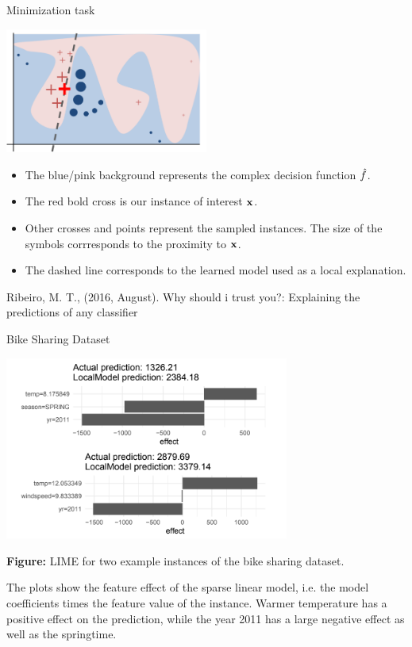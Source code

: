 \documentclass[11pt,compress,t,notes=noshow, xcolor=table]{beamer}
\begin{document}
\begin{vbframe}{Minimization task}
\begin{center}
 \includegraphics[width=0.5\textwidth]{figure/lime}
\end{center}
\begin{itemize}
  \item The blue/pink background represents the complex decision function $\fh$.
  \item The red bold cross is our instance of interest $\xv$.
  \item Other crosses and points represent the sampled instances. The size of the symbols corrresponds to the proximity to $\xv$.
  \item The dashed line corresponds to the learned model used as a local explanation.
\end{itemize}
{\tiny{Ribeiro, M. T., (2016, August). Why should i trust you?: Explaining the predictions of any classifier}}
\end{vbframe}

\begin{vbframe}{Bike Sharing Dataset}
\vspace{-.3cm}

\begin{center}
\includegraphics[width=0.7\textwidth]{figure/bike-figure.png}
\end{center} 

\footnotesize \textbf{Figure:} LIME for two example instances of the bike sharing dataset.

\normalsize
\vspace{0.2cm}
The plots show the feature effect of the sparse linear model, i.e. the model coefficients times the feature value of the instance.
Warmer temperature has a positive effect on the prediction, 
while the year 2011 has a large negative effect as well as the springtime.
\end{vbframe}
\end{document}
